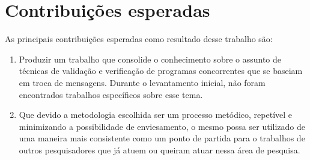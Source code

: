 \section{Contribuições esperadas} 

As principais contribuições esperadas como resultado desse trabalho são:

\begin{enumerate}
    \item Produzir um trabalho que consolide o conhecimento sobre o assunto de técnicas de validação e verificação de programas concorrentes que se baseiam em troca de mensagens. Durante o levantamento inicial, não foram encontrados trabalhos específicos sobre esse tema.
    \item Que devido a metodologia escolhida ser um processo metódico, repetível e minimizando a possibilidade de enviesamento, o mesmo possa ser utilizado de uma maneira mais consistente como um ponto de partida para o trabalhos de outros pesquisadores que já atuem ou queiram atuar nessa área de pesquisa.
\end{enumerate}